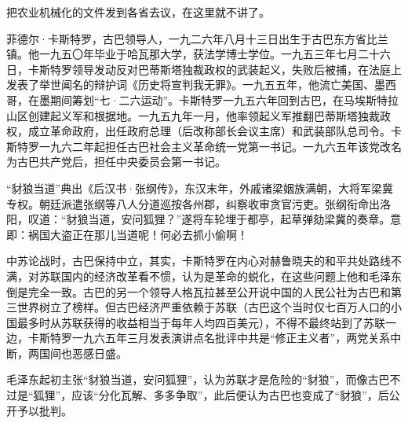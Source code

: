 把农业机械化的文件发到各省去议，在这里就不讲了。

\begin{maonote}
菲德尔·卡斯特罗，古巴领导人，一九二六年八月十三日出生于古巴东方省比兰镇。他一九五〇年毕业于哈瓦那大学，获法学博士学位。一九五三年七月二十六日，卡斯特罗领导发动反对巴蒂斯塔独裁政权的武装起义，失败后被捕，在法庭上发表了举世闻名的辩护词《历史将宣判我无罪》。一九五五年，他流亡美国、墨西哥，在墨期间筹划“七·二六运动”。卡斯特罗一九五六年回到古巴，在马埃斯特拉山区创建起义军和根据地。一九五九年一月，他率领起义军推翻巴蒂斯塔独裁政权，成立革命政府，出任政府总理（后改称部长会议主席）和武装部队总司令。卡斯特罗一九六二年起担任古巴社会主义革命统一党第一书记。一九六五年该党改名为古巴共产党后，担任中央委员会第一书记。

“豺狼当道”典出《后汉书·张纲传》，东汉末年，外戚诸梁姻族满朝，大将军梁冀专权。朝廷派遣张纲等八人分道巡按各州郡，纠察收审贪官污吏。张纲衔命出洛阳，叹道：“豺狼当道，安问狐狸？”遂将车轮埋于都亭，起草弹劾梁冀的奏章。意即：祸国大盗正在那儿当道呢！何必去抓小偷啊！

中苏论战时，古巴保持中立，其实，卡斯特罗在内心对赫鲁晓夫的和平共处路线不满，对苏联国内的经济改革看不惯，认为是革命的蜕化，在这些问题上他和毛泽东倒是完全一致。古巴的另一个领导人格瓦拉甚至公开说中国的人民公社为古巴和第三世界树立了榜样。但古巴经济严重依赖于苏联（古巴这个当时仅七百万人口的小国最多时从苏联获得的收益相当于每年人均四百美元），不得不最终站到了苏联一边，卡斯特罗一九六五年三月发表演讲点名批评中共是“修正主义者”，两党关系中断，两国间也恶感日盛。

毛泽东起初主张“豺狼当道，安问狐狸”，认为苏联才是危险的“豺狼”，而像古巴不过是“狐狸”，应该“分化瓦解、多多争取”，此后便认为古巴也变成了“豺狼”，后公开予以批判。


\end{maonote}

